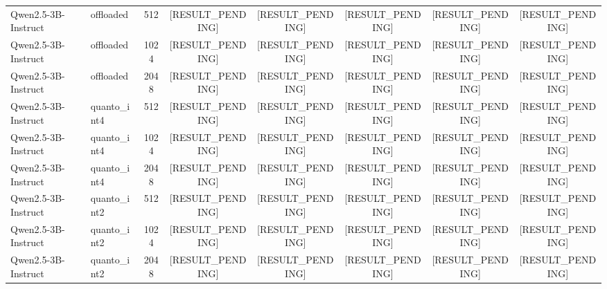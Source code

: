 \begin{table}[t]
\begin{tabular}{llcccccc}
\hline
Qwen2.5-3B-Instruct & offloaded & 512 & [RESULT_PENDING] & [RESULT_PENDING] & [RESULT_PENDING] & [RESULT_PENDING] & [RESULT_PENDING] \\
Qwen2.5-3B-Instruct & offloaded & 1024 & [RESULT_PENDING] & [RESULT_PENDING] & [RESULT_PENDING] & [RESULT_PENDING] & [RESULT_PENDING] \\
Qwen2.5-3B-Instruct & offloaded & 2048 & [RESULT_PENDING] & [RESULT_PENDING] & [RESULT_PENDING] & [RESULT_PENDING] & [RESULT_PENDING] \\
\hline
Qwen2.5-3B-Instruct & quanto_int4 & 512 & [RESULT_PENDING] & [RESULT_PENDING] & [RESULT_PENDING] & [RESULT_PENDING] & [RESULT_PENDING] \\
Qwen2.5-3B-Instruct & quanto_int4 & 1024 & [RESULT_PENDING] & [RESULT_PENDING] & [RESULT_PENDING] & [RESULT_PENDING] & [RESULT_PENDING] \\
Qwen2.5-3B-Instruct & quanto_int4 & 2048 & [RESULT_PENDING] & [RESULT_PENDING] & [RESULT_PENDING] & [RESULT_PENDING] & [RESULT_PENDING] \\
\hline
Qwen2.5-3B-Instruct & quanto_int2 & 512 & [RESULT_PENDING] & [RESULT_PENDING] & [RESULT_PENDING] & [RESULT_PENDING] & [RESULT_PENDING] \\
Qwen2.5-3B-Instruct & quanto_int2 & 1024 & [RESULT_PENDING] & [RESULT_PENDING] & [RESULT_PENDING] & [RESULT_PENDING] & [RESULT_PENDING] \\
Qwen2.5-3B-Instruct & quanto_int2 & 2048 & [RESULT_PENDING] & [RESULT_PENDING] & [RESULT_PENDING] & [RESULT_PENDING] & [RESULT_PENDING] \\
\hline
\bottomrule
\end{tabular}
\end{table}
